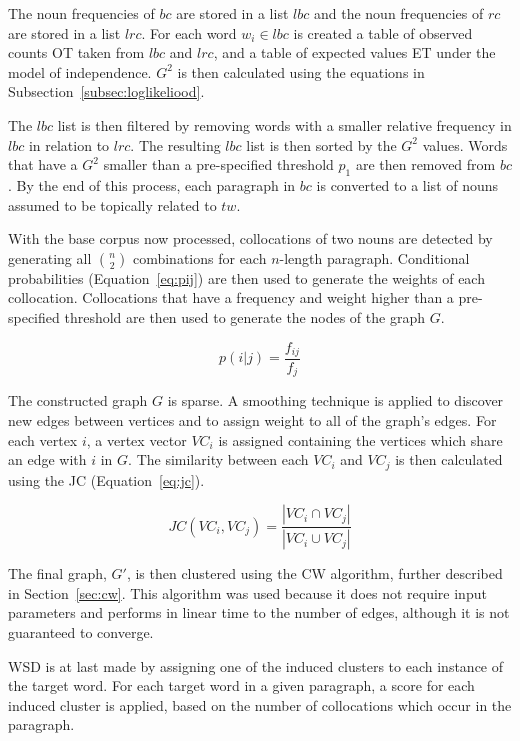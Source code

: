 The noun frequencies of $bc$ are stored in a list $lbc$ and the noun
frequencies of $rc$ are stored in a list $lrc$. For each word $w_i \in lbc$ is 
created a table of observed counts OT taken from $lbc$ and $lrc$, and a table 
of expected values ET under the model of independence. $G^2$ is then calculated 
using the equations in Subsection~\ref{subsec:loglikeliood}.

The $lbc$ list is then filtered by removing words with a smaller relative 
frequency in $lbc$ in relation to $lrc$. The resulting $lbc$ list is then 
sorted by the $G^2$ values. Words that have a $G^2$ smaller than a 
pre-specified threshold $p_1$ are then removed from $bc$. By the end of this 
process, each paragraph in $bc$ is converted to a list of nouns assumed to be 
topically related to $tw$.

With the base corpus now processed, collocations of two nouns are detected by
generating all $\binom{n}{2}$ combinations for each $n$-length paragraph.
Conditional probabilities (Equation~\ref{eq:pij}) are then used to generate the
weights of each collocation. Collocations that have a frequency and weight
higher than a pre-specified threshold are then used to generate the nodes of the
graph $G$.

\begin{equation}\label{eq:pij}
 p(i|j) = \frac{f_{ij}}{f_{j}}
\end{equation}

The constructed graph $G$ is sparse. A smoothing technique is applied to
discover new edges between vertices and to assign weight to all of the graph's
edges. For each vertex $i$, a vertex vector $VC_i$ is assigned containing the
vertices which share an edge with $i$ in $G$. The similarity between each $VC_i$
and $VC_j$ is then calculated using the \ac{JC} (Equation~\ref{eq:jc}).

\begin{equation}\label{eq:jc}
 JC(VC_i, VC_j) = \frac{|VC_i \cap VC_j|}
                       {|VC_i \cup VC_j|}
\end{equation}

The final graph, $G'$, is then clustered using the \ac{CW} algorithm, further 
described in Section~\ref{sec:cw}. This algorithm was used because it does not 
require input parameters and performs in linear time to the number of edges, 
although it is not guaranteed to converge.

\ac{WSD} is at last made by assigning one of the induced clusters to each
instance of the target word. For each target word in a given paragraph, a score
for each induced cluster is applied, based on the number of collocations which
occur in the paragraph.

